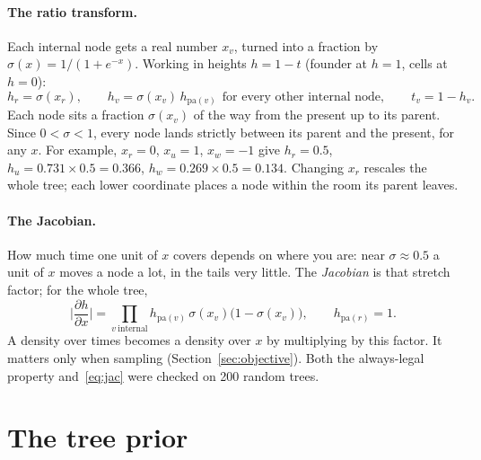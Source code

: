 \documentclass[11pt]{article}
\newcommand{\pa}{\mathrm{pa}}
\newcommand{\sig}{\sigma}
\begin{document}
\paragraph{The ratio transform.} Each internal node gets a real number $x_v$, turned into a fraction
by $\sig(x)=1/(1+e^{-x})$. Working in heights $h=1-t$ (founder at $h=1$, cells at $h=0$):
\begin{equation}
h_r=\sig(x_r),\qquad h_v=\sig(x_v)\,h_{\pa(v)}\ \ \text{for every other internal node},\qquad t_v=1-h_v .
\label{eq:ratio}
\end{equation}
Each node sits a fraction $\sig(x_v)$ of the way from the present up to its parent. Since
$0<\sig<1$, every node lands strictly between its parent and the present, for any $x$. For example,
$x_r=0$, $x_u=1$, $x_w=-1$ give $h_r=0.5$, $h_u=0.731\times0.5=0.366$, $h_w=0.269\times0.5=0.134$. Changing
$x_r$ rescales the whole tree; each lower coordinate places a node within the room its parent leaves.

\paragraph{The Jacobian.} How much time one unit of $x$ covers depends on where you are: near
$\sig\approx0.5$ a unit of $x$ moves a node a lot, in the tails very little. The \emph{Jacobian} is that
stretch factor; for the whole tree,
\begin{equation}
\Big|\frac{\partial h}{\partial x}\Big|=\prod_{v\ \text{internal}}h_{\pa(v)}\,\sig(x_v)\big(1-\sig(x_v)\big),
\qquad h_{\pa(r)}=1 .
\label{eq:jac}
\end{equation}
A density over times becomes a density over $x$ by multiplying by this factor. It matters only when
sampling (Section~\ref{sec:objective}). Both the always-legal property and~\eqref{eq:jac} were checked
on 200 random trees.

\section{The tree prior}\label{sec:prior}
\end{document}
